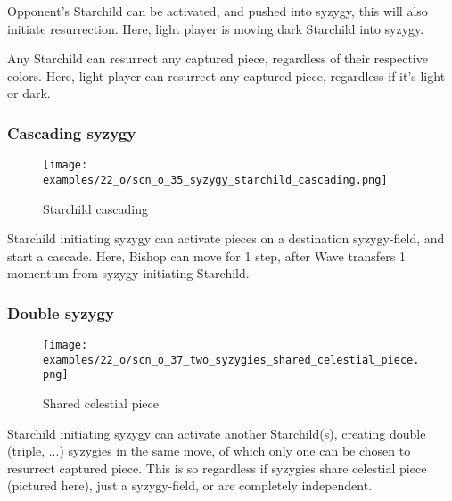 Opponent's Starchild can be activated, and pushed into syzygy, this will also
initiate resurrection. Here, light player is moving dark Starchild into syzygy.

Any Starchild can resurrect any captured piece, regardless of their respective
colors. Here, light player can resurrect any captured piece, regardless if it's
light or dark.

\clearpage %

\subsubsection*{Cascading syzygy}

\vspace*{-1.2\baselineskip}
\noindent
\begin{figure}[!h]
\texttt{[image: examples/22\_o/scn\_o\_35\_syzygy\_starchild\_cascading.png]}
\caption{Starchild cascading}
\label{fig:scn_o_35_syzygy_starchild_cascading}
\end{figure}

Starchild initiating syzygy can activate pieces on a destination syzygy-field,
and start a cascade. Here, Bishop can move for 1 step, after Wave transfers 1
momentum from syzygy-initiating Starchild.

\clearpage %

\subsubsection*{Double syzygy}

\vspace*{-1.2\baselineskip}
\noindent
\begin{figure}[!h]
\texttt{[image: examples/22\_o/scn\_o\_37\_two\_syzygies\_shared\_celestial\_piece.png]}
\caption{Shared celestial piece}
\label{fig:scn_o_37_two_syzygies_shared_celestial_piece}
\end{figure}

Starchild initiating syzygy can activate another Starchild(s), creating double
(triple, ...) syzygies in the same move, of which only one can be chosen to
resurrect captured piece. This is so regardless if syzygies share celestial
piece (pictured here), just a syzygy-field, or are completely independent.

